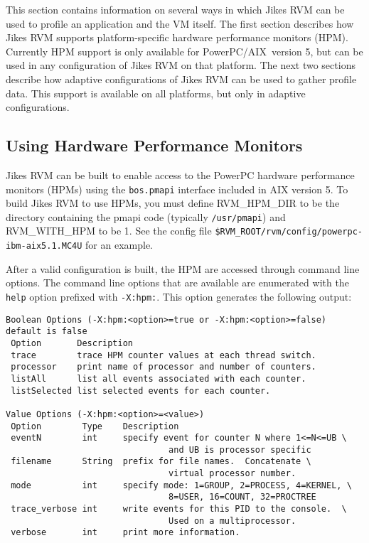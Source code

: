 This section contains information on several ways in which
Jikes\TMweb{} RVM can be used to profile an application and the VM
itself.  The first section describes how Jikes RVM supports
platform-specific hardware performance monitors (HPM). Currently HPM
support is only available for
PowerPC\TMweb/AIX\TMweb\ version 5, but can be
used in any configuration of Jikes RVM on that platform.  The next two
sections describe how adaptive configurations of Jikes RVM can be used
to gather profile data.  This support is available on all platforms,
but only in adaptive configurations.

\subsection{Using Hardware Performance Monitors}

Jikes RVM can be built to enable access to the PowerPC hardware
performance monitors (HPMs) using the {\tt bos.pmapi} interface 
included in AIX version 5. To build Jikes RVM to use
HPMs, you must define RVM\_HPM\_DIR to be the directory containing
the pmapi code (typically {\tt /usr/pmapi}) and RVM\_WITH\_HPM to be 1.
See the config file {\tt \$RVM\_\-ROOT/rvm/config/powerpc-ibm-aix5.1.MC4U} for
an example.

After a valid configuration is built, the HPM are accessed through 
command line options. 
The command line options that are available are enumerated with the 
{\tt help} option prefixed with {\tt -X:hpm:}.  This option
generates the following output:
%
\begin{verbatim}
Boolean Options (-X:hpm:<option>=true or -X:hpm:<option>=false) default is false
 Option       Description
 trace        trace HPM counter values at each thread switch.
 processor    print name of processor and number of counters.
 listAll      list all events associated with each counter.
 listSelected list selected events for each counter.

Value Options (-X:hpm:<option>=<value>)
 Option        Type    Description
 eventN        int     specify event for counter N where 1<=N<=UB \
                                and UB is processor specific
 filename      String  prefix for file names.  Concatenate \
                                virtual processor number.
 mode          int     specify mode: 1=GROUP, 2=PROCESS, 4=KERNEL, \
                                8=USER, 16=COUNT, 32=PROCTREE
 trace_verbose int     write events for this PID to the console.  \
                                Used on a multiprocessor.
 verbose       int     print more information.
\end{verbatim}


